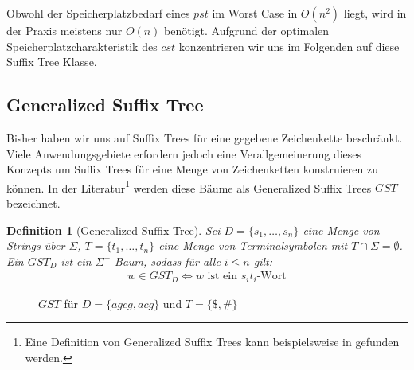 \documentclass[12pt]{report}
\newtheorem{definition}{Definition}
\begin{document}
Obwohl der Speicherplatzbedarf eines $pst$ im Worst Case in $O(n^2)$ liegt, wird in der Praxis meistens nur $O(n)$ benötigt.
Aufgrund der optimalen Speicherplatzcharakteristik des $cst$ konzentrieren wir uns im Folgenden auf diese Suffix Tree Klasse.

\subsection{Generalized Suffix Tree}
\label{sec:GeneralizedSuffixTree}

Bisher haben wir uns auf Suffix Trees für eine gegebene Zeichenkette beschränkt. Viele Anwendungsgebiete erfordern jedoch eine Verallgemeinerung dieses Konzepts um Suffix Trees für eine Menge von Zeichenketten konstruieren zu können. In der Literatur\footnote{Eine Definition von Generalized Suffix Trees kann beispielsweise in \cite{Gusfield1997} gefunden werden.} werden diese Bäume als Generalized Suffix Trees $GST$ bezeichnet.

\begin{definition}[Generalized Suffix Tree]
Sei $D = \{s_1, \dots, s_n\}$ eine Menge von Strings über $\Sigma$, $T = \{t_1, \dots, t_n\}$ eine Menge von Terminalsymbolen mit $T \cap \Sigma = \emptyset$. Ein $GST_D$ ist ein $\Sigma^+$-Baum, sodass für alle $i \leq n$ gilt:
\begin{gather*}
    w \in GST_D \Longleftrightarrow w \text{ ist ein } s_it_i\text{-Wort}
\end{gather*}
\label{def:GeneralizedSuffixTree}
\end{definition}

\begin{figure}[htb]
\centering
{}
\caption{$GST$ für $D = \{agcg, acg\}$ und $T = \{\$, \#\}$}
\label{fig:GSTAgcgAcg}
\end{figure}
\end{document}
